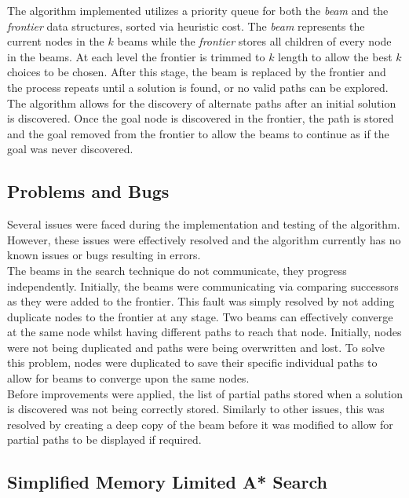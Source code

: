\documentclass[]{article}
\begin{document}
The algorithm implemented utilizes a priority queue for both the \textit{beam} and the \textit{frontier} data structures, sorted via heuristic cost. The \textit{beam} represents the current nodes in the $k$ beams while the \textit{frontier} stores all children of every node in the beams. At each level the frontier is trimmed to $k$ length to allow the best $k$ choices to be chosen. After this stage, the beam is replaced by the frontier and the process repeats until a solution is found, or no valid paths can be explored. \\

The algorithm allows for the discovery of alternate paths after an initial solution is discovered. Once the goal node is discovered in the frontier, the path is stored and the goal removed from the frontier to allow the beams to continue as if the goal was never discovered.

\subsection*{Problems and Bugs}

Several issues were faced during the implementation and testing of the algorithm. However, these issues were effectively resolved and the algorithm currently has no known issues or bugs resulting in errors.\\

The beams in the search technique do not communicate, they progress independently. Initially, the beams were communicating via comparing successors as they were added to the frontier. This fault was simply resolved by not adding duplicate nodes to the frontier at any stage. Two beams can effectively converge at the same node whilst having different paths to reach that node. Initially, nodes were not being duplicated and paths were being overwritten and lost. To solve this problem, nodes were duplicated to save their specific individual paths to allow for beams to converge upon the same nodes.\\

Before improvements were applied, the list of partial paths stored when a solution is discovered was not being correctly stored. Similarly to other issues, this was resolved by creating a deep copy of the beam before it was modified to allow for partial paths to be displayed if required.\\

\pagebreak

\begin{center}
	\section*{Simplified Memory Limited A* Search}
\end{center}
\end{document}
